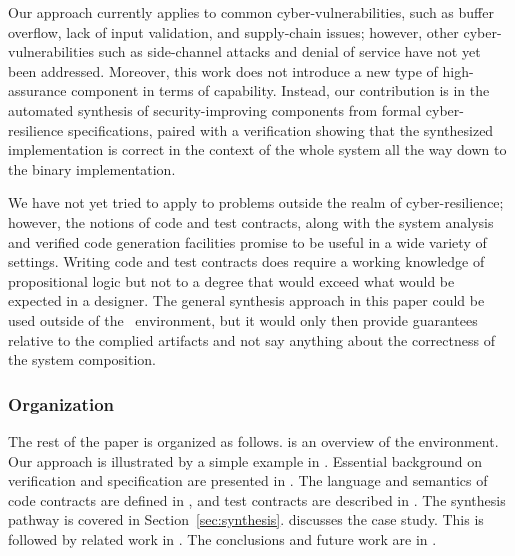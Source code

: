 Our approach currently applies to common cyber-vulnerabilities, such
as buffer overflow, lack of input validation, and supply-chain issues;
however, other cyber-vulnerabilities such as side-channel attacks and
denial of service have not yet been addressed. Moreover, this work
does not introduce a new type of high-assurance component in terms of
capability. Instead, our contribution is in the automated synthesis of
security-improving components from formal cyber-resilience
specifications, paired with a verification showing that the
synthesized implementation is correct in the context of the whole system all the way down to the binary implementation. 

We have not yet tried to apply
{\brfcs} to problems outside the realm of cyber-resilience; however,
the notions of code and test contracts, along with the system analysis
and verified code generation facilities promise to be useful in a wide
variety of settings. Writing code and test contracts does require a working knowledge of propositional logic but not to a degree that would exceed what would be expected in a designer. The general synthesis approach in this paper could be used outside of the \brfcs\ environment, but it would only then provide guarantees relative to the complied artifacts and not say anything about the correctness of the system composition.

\subsubsection*{Organization}
The rest of the paper is organized as follows.
 is an overview of the {\brfcs} environment.
Our approach is illustrated by a simple example in
. Essential background on {\agr} verification and specification are
presented in .  The language and semantics of code
contracts are defined in , and test
contracts are described in .  The synthesis pathway
is covered in Section~\ref{sec:synthesis}.
 discusses the case study.
This is followed by related work in .
The conclusions and future work are in .
